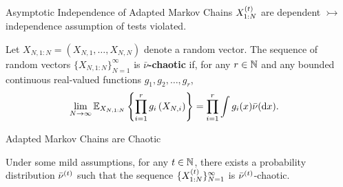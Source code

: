 \documentclass[10pt,xcolor=table]{beamer}
\begin{document}
\begin{frame}{Asymptotic Independence of Adapted Markov Chains}
	$X_{1:N}^{(t)}$ are dependent $\rightarrowtail$
	independence assumption of tests violated. \pause
	\begin{definition}
		Let $X_{N,1:N} = (X_{N,1}, \dots, X_{N,N})$ denote a random vector.
		The sequence of random vectors $\{ X_{N,1:N} \}_{N=1}^{\infty}$ is \textbf{$\bar\nu$-chaotic} if, 
		for any $r \in \mathbb{N}$ and any bounded continuous real-valued functions $g_{1}, g_{2}, \ldots, g_{r}$,
		\[
		\begin{aligned}
			\lim _{N \rightarrow \infty}\mathbb{E}_{X_{N,1:N}}\left\{\prod_{i=1}^{r}g_{i}\left(X_{N,i}\right)\right\}
			&= \prod_{i=1}^{r} \int g_{i}(x) \bar\nu(\mathrm{d} x).
		\end{aligned}
		\]
		\label{chaos definition}
	\end{definition}
\end{frame}

\begin{frame}{Adapted Markov Chains are Chaotic}
	\begin{theorem}
		\label{propagation of chaos for x}
		Under some mild assumptions, for any $t \in \mathbb{N}$, there exists a probability 
		distribution $\bar{\nu}^{(t)}$ such that the sequence 
		$\{X_{1:N}^{(t)}\}_{N=1}^{\infty}$ is $\bar{\nu}^{(t)}$-chaotic.
	\end{theorem}
	
\end{frame}
\end{document}
